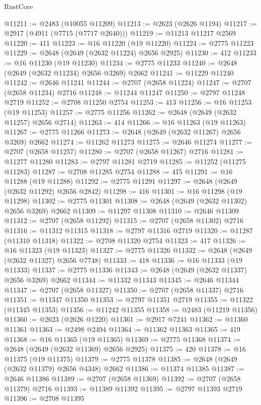 \begin{lexlean}{RustCore}
\begin{coremodule}
@11211 := @2483 (@10055 @11209)
@11213 := @2623 (@2626 @1194)
@11217 := @2917 (@4911 (@7715 (@7717 @2640)))
@11219 := @11213 @11217 @2569
@11220 := 411
@11223 := @16 @11220 (@19 @11220)
@11224 := @2775 @11223
@11229 := @2648 (@2649 (@2632 @11224) @2656 @2925)
@11230 := 412
@11233 := @16 @11230 (@19 @11230)
@11234 := @2775 @11233
@11240 := @2648 (@2649 (@2632 @11234) @2656 @3269) @2662
@11241 := @11229 @11240
@11242 := @2646 @11241
@11244 := @2707 (@2658 @11224)
@11247 := @2707 (@2658 @11234) @2716
@11248 := @11244 @11247
@11250 := @2797 @11248 @2719
@11252 := @2708 @11250 @2754
@11253 := 413
@11256 := @16 @11253 (@19 @11253)
@11257 := @2775 @11256
@11262 := @2648 (@2649 (@2632 @11257) @2656 @2714)
@11263 := 414
@11266 := @16 @11263 (@19 @11263)
@11267 := @2775 @11266
@11273 := @2648 (@2649 (@2632 @11267) @2656 @3269) @2662
@11274 := @11262 @11273
@11275 := @2646 @11274
@11277 := @2707 (@2658 @11257)
@11280 := @2707 (@2658 @11267) @2716
@11281 := @11277 @11280
@11283 := @2797 @11281 @2719
@11285 := @11252 (@11275 @11283)
@11287 := @2708 @11285 @2754
@11288 := 415
@11291 := @16 @11288 (@19 @11288)
@11292 := @2775 @11291
@11297 := @2648 (@2649 (@2632 @11292) @2656 @2842)
@11298 := 416
@11301 := @16 @11298 (@19 @11298)
@11302 := @2775 @11301
@11308 := @2648 (@2649 (@2632 @11302) @2656 @3269) @2662
@11309 := @11297 @11308
@11310 := @2646 @11309
@11312 := @2707 (@2658 @11292)
@11315 := @2707 (@2658 @11302) @2716
@11316 := @11312 @11315
@11318 := @2797 @11316 @2719
@11320 := @11287 (@11310 @11318)
@11322 := @2708 @11320 @2754
@11323 := 417
@11326 := @16 @11323 (@19 @11323)
@11327 := @2775 @11326
@11332 := @2648 (@2649 (@2632 @11327) @2656 @7748)
@11333 := 418
@11336 := @16 @11333 (@19 @11333)
@11337 := @2775 @11336
@11343 := @2648 (@2649 (@2632 @11337) @2656 @3269) @2662
@11344 := @11332 @11343
@11345 := @2646 @11344
@11347 := @2707 (@2658 @11327)
@11350 := @2707 (@2658 @11337) @2716
@11351 := @11347 @11350
@11353 := @2797 @11351 @2719
@11355 := @11322 (@11345 @11353)
@11356 := @11242 @11355
@11358 := @2483 (@11219 @11356)
@11360 := @2623 (@2626 @1220)
@11361 := @2917 @7241
@11362 := @11360 @11361
@11363 := @2498 @2494
@11364 := @11362 @11363
@11365 := 419
@11368 := @16 @11365 (@19 @11365)
@11369 := @2775 @11368
@11374 := @2648 (@2649 (@2632 @11369) @2656 @2925)
@11375 := 420
@11378 := @16 @11375 (@19 @11375)
@11379 := @2775 @11378
@11385 := @2648 (@2649 (@2632 @11379) @2656 @4348) @2662
@11386 := @11374 @11385
@11387 := @2646 @11386
@11389 := @2707 (@2658 @11369)
@11392 := @2707 (@2658 @11379) @2716
@11393 := @11389 @11392
@11395 := @2797 @11393 @2719
@11396 := @2708 @11395

\end{coremodule}
\end{lexlean}

